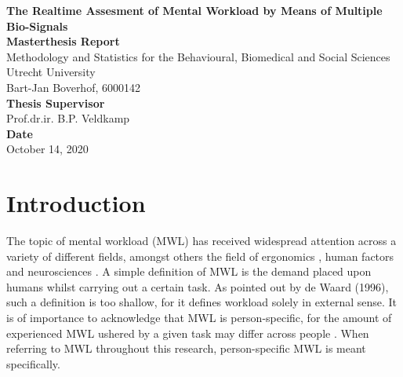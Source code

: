 \documentclass{article}
\begin{document}
\begin{titlepage}
\begin{center}
\LARGE{\textbf{The Realtime Assesment of Mental Workload by Means of Multiple Bio-Signals}}\\
\vspace*{2\baselineskip}
\Large{\textbf{Masterthesis Report}}\\
Methodology and Statistics for the Behavioural, Biomedical and Social Sciences\\
\vspace*{1\baselineskip}
Utrecht University\\
\vspace*{4\baselineskip}
{Bart-Jan Boverhof, 6000142}\\
\vspace*{1\baselineskip}
{\textbf{Thesis Supervisor}}\\
Prof.dr.ir. B.P. Veldkamp\\
\vspace*{1\baselineskip}
{\textbf{Date}}\\
October 14, 2020\\
\vspace*{1\baselineskip}
\end{center}
\end{titlepage}

\section{Introduction}
The topic of mental workload (MWL) has received widespread attention across a variety of different fields, amongst others the field of ergonomics \cite{young2015state}, human factors \cite{pretorius2007development} and neurosciences \cite{shuggi2017mental}.
A simple definition of MWL is the demand placed upon humans whilst carrying out a certain task. As pointed out by de Waard (1996), such a definition is too shallow, for it defines workload solely in external sense. It is of importance to acknowledge that MWL is person-specific, for the amount of experienced MWL ushered by a given task may differ across people \cite{de1996measurement}. When referring to MWL throughout this research, person-specific MWL is meant specifically.
\end{document}

